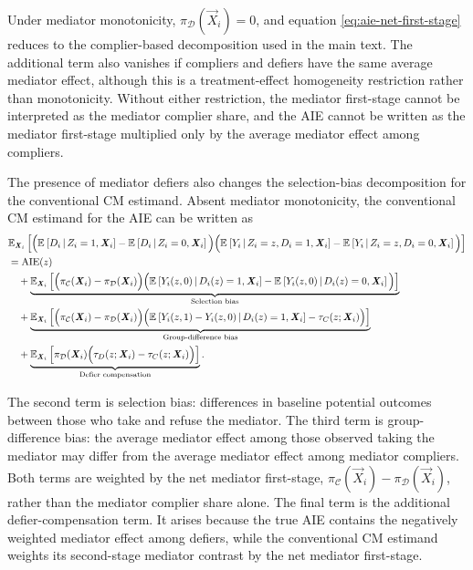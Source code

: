 Under mediator monotonicity, \(\pi_{\mathcal D}(\vec X_i)=0\), and equation \eqref{eq:aie-net-first-stage} reduces to the complier-based decomposition used in the main text.
The additional term also vanishes if compliers and defiers have the same average mediator effect, although this is a treatment-effect homogeneity restriction rather than monotonicity.
Without either restriction, the mediator first-stage cannot be interpreted as the mediator complier share, and the AIE cannot be written as the mediator first-stage multiplied only by the average mediator effect among compliers.

The presence of mediator defiers also changes the selection-bias decomposition for the conventional CM estimand. Absent mediator monotonicity, the conventional CM estimand for the AIE can be written as
\begin{align*}
    &\E[\vec X_i]{ \Big( \Egiven{D_i}{Z_i=1,\vec X_i} - \Egiven{D_i}{Z_i=0,\vec X_i} \Big) \Big( \Egiven{Y_i}{Z_i=z,D_i=1,\vec X_i} - \Egiven{Y_i}{Z_i=z,D_i=0,\vec X_i} \Big) } \notag\\
    &= \operatorname{AIE}(z)\\
    &\quad+ \underbrace{ \E[\vec X_i]{ \Big( \pi_{\mathcal C}(\vec X_i)-\pi_{\mathcal D}(\vec X_i) \Big) \Big( \Egiven{Y_i(z,0)} {D_i(z)=1,\vec X_i} - \Egiven{Y_i(z,0)} {D_i(z)=0,\vec X_i} \Big) } }_{ \text{Selection bias} } \\
    &\quad+ \underbrace{ \E[\vec X_i]{ \Big( \pi_{\mathcal C}(\vec X_i)-\pi_{\mathcal D}(\vec X_i) \Big) \Big( \Egiven{Y_i(z,1)-Y_i(z,0)} {D_i(z)=1,\vec X_i} - \tau_C(z;\vec X_i) \Big) } }_{ \text{Group-difference bias} } \notag\\
    &\quad+ \underbrace{ \E[\vec X_i]{ \pi_{\mathcal D}(\vec X_i) \Big( \tau_D(z;\vec X_i) - \tau_C(z;\vec X_i) \Big) } }_{ \text{Defier compensation} }.
\end{align*}

The second term is selection bias: differences in baseline potential outcomes between those who take and refuse the mediator.
The third term is group-difference bias: the average mediator effect among those observed taking the mediator may differ from the average mediator effect among mediator compliers.
Both terms are weighted by the net mediator first-stage, \(\pi_{\mathcal C}(\vec X_i)-\pi_{\mathcal D}(\vec X_i)\), rather than the mediator complier share alone.
The final term is the additional defier-compensation term. It arises because the true AIE contains the negatively weighted mediator effect among defiers, while the conventional CM estimand weights its second-stage mediator contrast by the net mediator first-stage.

